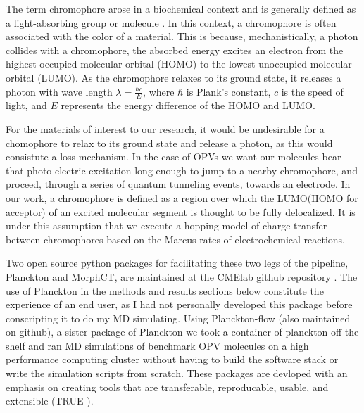 The term chromophore arose in a biochemical context and is generally defined
as a light-absorbing group or molecule \cite{biochemistry}.
In this context, a chromophore is often associated with the color of a material.
This is because, mechanistically, a photon collides with a chromophore, the absorbed energy
excites an electron from the highest occupied molecular orbital (HOMO) to the
lowest unoccupied molecular orbital (LUMO). As the chromophore relaxes to its
ground state, it releases a photon with wave length $\lambda = \frac{\hbar c}{E}$,
where $\hbar$ is Plank's constant, $c$ is the speed of light, and $E$ represents the
energy difference of the HOMO and LUMO. 

For the materials of interest to our research, it would be undesirable for a chomophore to relax to its ground
state and release a photon, as this would consistute a loss mechanism. In the case of
OPVs we want our molecules bear that photo-electric
excitation long enough to jump to a nearby chromophore, and proceed, through a
series of quantum tunneling events, towards an electrode. 
In our work, a chromophore is defined as a region over which the
LUMO(HOMO for acceptor) of an excited molecular segment is thought to be fully delocalized. 
It is under this assumption that we execute a hopping model of charge transfer between
chromophores based on the Marcus rates of electrochemical reactions.  

Two open source python packages for
facilitating these two legs of the pipeline, Planckton and MorphCT, are maintained at 
the CMElab github repository \cite{cmelab}.
The use of Planckton in the methods and results sections below
constitute the experience of an end user, as I had not personally developed this package before conscripting it
to do my MD simulating. 
Using Planckton-flow (also maintained on github), a sister package
of Planckton we took a container of planckton off the shelf and ran MD simulations of benchmark OPV
molecules on a high performance computing cluster without having to build the software stack or write the
simulation scripts from scratch. These packages are devloped with an emphasis on creating tools that are
transferable, reproducable, usable, and extensible (TRUE \cite{Cummings2017}).

